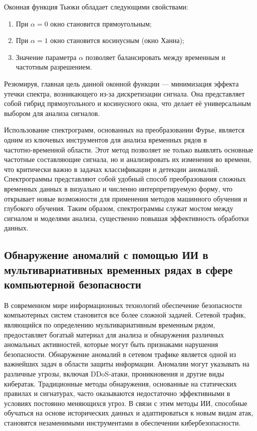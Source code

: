 \documentclass[spec, och, diploma]{SCWorks}
\begin{document}
            Оконная функция Тьюки обладает следующими свойствами:
            
            \begin{enumerate}
                \item При $\alpha = 0$ окно становится прямоугольным;
                \item При $\alpha = 1$ окно становится косинусным (окно Ханна);
                \item Значение параметра $\alpha$ позволяет балансировать между
                временным и частотным разрешением.
            \end{enumerate}

            Резюмируя, главная цель данной оконной функции — минимизация эффекта
            утечки спектра, возникающего из-за дискретизации сигнала. Она
            представляет собой гибрид прямоугольного и косинусного окна, что
            делает её универсальным выбором для анализа сигналов.
            
            Использование спектрограмм, основанных на преобразовании Фурье,
            является одним из ключевых инструментов для анализа временных рядов
            в\\ частотно-временной области. Этот метод позволяет не только
            выявлять основные частотные составляющие сигнала, но и анализировать
            их изменения во времени, что критически важно в задачах
            классификации и детекции аномалий. Спектрограммы представляют собой
            удобный способ преобразования сложных временных данных в визуально и
            численно интерпретируемую форму, что открывает новые возможности для
            применения методов машинного обучения и глубокого обучения. Таким
            образом, спектрограммы служат мостом между сигналом и моделями
            анализа, существенно повышая эффективность обработки данных.

    \subsection{Обнаружение аномалий с помощью ИИ в мультивариативных временных рядах в сфере компьютерной безопасности}

        В современном мире информационных технологий обеспечение безопасности
        компьютерных систем становится все более сложной задачей. Сетевой
        трафик, являющийся по определению мультивариативным временным рядом,
        предоставляет богатый материал для анализа и обнаружения различных
        аномальных активностей, которые могут быть признаками нарушения
        безопасности. Обнаружение аномалий в сетевом трафике является одной из
        важнейших задач в области защиты информации. Аномалии могут указывать на
        различные угрозы, включая DDoS-атаки, проникновения и другие виды
        кибератак. Традиционные методы обнаружения, основанные на статических
        правилах и сигнатурах, часто оказываются недостаточно эффективными в
        условиях постоянно меняющихся угроз. В связи с этим методы ИИ, способные
        обучаться на основе исторических данных и адаптироваться к новым видам
        атак, становятся незаменимыми инструментами в обеспечении
        кибербезопасности.
\end{document}
